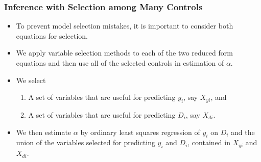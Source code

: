 \documentclass[
  shownotes,
  xcolor={svgnames},
  hyperref={colorlinks,citecolor=DarkBlue,linkcolor=DarkRed,urlcolor=DarkBlue}
  , aspectratio=169]{beamer}
\begin{document}
\begin{frame}[fragile]
\frametitle{Inference with Selection among Many Controls}

\begin{itemize}


\item To prevent model selection mistakes, it is important to consider both equations for selection.
\medskip
\item We apply variable selection methods to each of the two reduced form equations and then use all of the selected controls in estimation of $\alpha$. 
\medskip
\item We select
\begin{enumerate}
\item A set of variables that are useful for predicting $y_i$, say $X_{yi}$, and 
\item A set of variables that are useful for predicting $D_i$, say $X_{di}$.

\end{enumerate}
\item We then estimate $\alpha$ by ordinary least squares regression of $y_i$ on $D_i$ and the union of the variables selected for predicting $y_i$ and $D_i$, contained in $X_{yi}$ and $X_{di}$. 



\end{itemize}



\end{frame}
\end{document}
